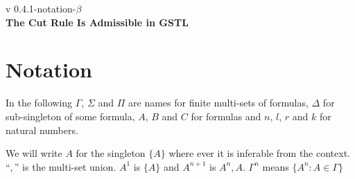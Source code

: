 \documentclass[a4paper, 12pt]{paper}
\begin{document}
{\noindent
	v 0.4.1-notation-$\beta$ \\
{\large\textbf{The Cut Rule Is Admissible in GSTL}}
}
\\
\setcounter{section}{-1}
\section{Notation} In the following $\Gamma$, $\Sigma$ and $\Pi$ are names for finite multi-sets of formulas, $\Delta$ for sub-singleton of some formula, $A$, $B$ and $C$ for formulas and $n$, $l$, $r$ and $k$ for natural numbers.

We will write $A$ for the singleton $\{A\}$ where ever it is inferable from the context.
``$,$'' is the multi-set union.
$A^1$ is $\{A\}$ and $A^{n+1}$ is $A^n, A$. $\Gamma^n$ means $\{ A^n : A \in \Gamma \}$







\end{document}
